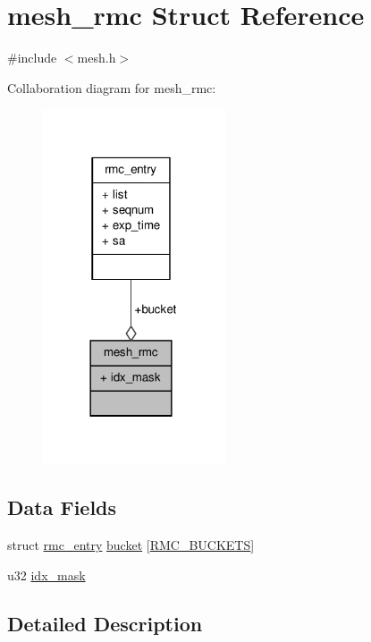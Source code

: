 \hypertarget{structmesh__rmc}{\section{mesh\-\_\-rmc Struct Reference}
\label{structmesh__rmc}
}


{\ttfamily \#include $<$mesh.\-h$>$}



Collaboration diagram for mesh\-\_\-rmc\-:
\nopagebreak
\begin{figure}[H]
\begin{center}
\leavevmode
\includegraphics[width=153pt]{structmesh__rmc__coll__graph}
\end{center}
\end{figure}
\subsection*{Data Fields}
\begin{DoxyCompactItemize}
\item 
struct \hyperlink{structrmc__entry}{rmc\-\_\-entry} \hyperlink{structmesh__rmc_a65c3b74ae0afdff4662c4079c8bde59f}{bucket} \mbox{[}\hyperlink{mesh_8h_a2909ba21ed27a80429f34262b9dda565}{R\-M\-C\-\_\-\-B\-U\-C\-K\-E\-T\-S}\mbox{]}
\item 
u32 \hyperlink{structmesh__rmc_ae4f16a108310e98c6a5a222966147624}{idx\-\_\-mask}
\end{DoxyCompactItemize}


\subsection{Detailed Description}


